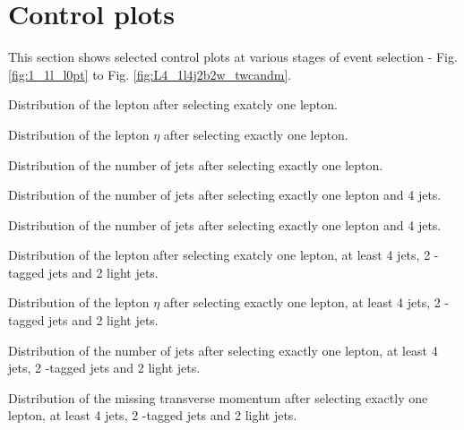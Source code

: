 



\clearpage
\section{Control plots}
\label{sec:control_plots}

This section shows selected control plots at various stages of event selection - Fig. \ref{fig:1_1l_l0pt} to Fig. \ref{fig:L4_1l4j2b2w_twcandm}.

{Distribution of the lepton \pt after selecting exatcly one lepton.}

{Distribution of the lepton $\eta$ after selecting exactly one lepton.}

{Distribution of the number of jets after selecting exactly one lepton.}

{Distribution of the number of jets after selecting exactly one lepton and 4 jets.}

{Distribution of the number of jets after selecting exactly one lepton and 4 jets.}

{Distribution of the lepton \pt after selecting exatcly one lepton, at least 4 jets, 2 \cPqb-tagged jets and 2 light jets.}

{Distribution of the lepton $\eta$ after selecting exactly one lepton, at least 4 jets, 2 \cPqb-tagged jets and 2 light jets.}

{Distribution of the number of jets after selecting exactly one lepton, at least 4 jets, 2 \cPqb-tagged jets and 2 light jets.}

{Distribution of the missing transverse momentum after selecting exactly one lepton, at least 4 jets, 2 \cPqb-tagged jets and 2 light jets.}

